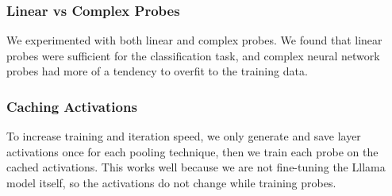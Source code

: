 \documentclass{article}
\begin{document}
\subsubsection{Linear vs Complex Probes}
We experimented with both linear and complex probes. We found that linear probes were sufficient for the classification task, and complex neural network probes had more of a tendency to overfit to the training data. 

\subsubsection{Caching Activations}
To increase training and iteration speed, we only generate and save layer activations once for each pooling technique, then we train each probe on the cached activations. This works well because we are not fine-tuning the Lllama model itself, so the activations do not change while training probes. 
 



\end{document}
